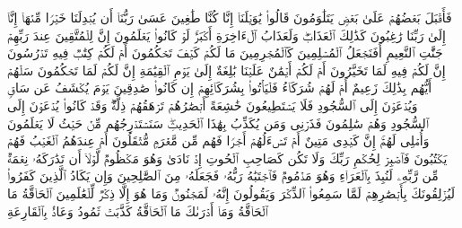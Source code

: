 \startbuffer[\q:68:30]
فَأَقۡبَلَ بَعۡضُهُمۡ عَلَىٰ بَعۡضࣲ یَتَلَٰوَمُونَ%
\stopbuffer
\startbuffer[\q:68:31]
قَالُوا۟ یَٰوَیۡلَنَاۤ إِنَّا كُنَّا طَٰغِینَ%
\stopbuffer
\startbuffer[\q:68:32]
عَسَىٰ رَبُّنَاۤ أَن یُبۡدِلَنَا خَیۡرࣰا مِّنۡهَاۤ إِنَّاۤ إِلَىٰ رَبِّنَا رَٰغِبُونَ%
\stopbuffer
\startbuffer[\q:68:33]
كَذَٰلِكَ ٱلۡعَذَابُۖ وَلَعَذَابُ ٱلۡءَاخِرَةِ أَكۡبَرُۚ لَوۡ كَانُوا۟ یَعۡلَمُونَ%
\stopbuffer
\startbuffer[\q:68:34]
إِنَّ لِلۡمُتَّقِینَ عِندَ رَبِّهِمۡ جَنَّٰتِ ٱلنَّعِیمِ%
\stopbuffer
\startbuffer[\q:68:35]
أَفَنَجۡعَلُ ٱلۡمُسۡلِمِینَ كَٱلۡمُجۡرِمِینَ%
\stopbuffer
\startbuffer[\q:68:36]
مَا لَكُمۡ كَیۡفَ تَحۡكُمُونَ%
\stopbuffer
\startbuffer[\q:68:37]
أَمۡ لَكُمۡ كِتَٰبࣱ فِیهِ تَدۡرُسُونَ%
\stopbuffer
\startbuffer[\q:68:38]
إِنَّ لَكُمۡ فِیهِ لَمَا تَخَیَّرُونَ%
\stopbuffer
\startbuffer[\q:68:39]
أَمۡ لَكُمۡ أَیۡمَٰنٌ عَلَیۡنَا بَٰلِغَةٌ إِلَىٰ یَوۡمِ ٱلۡقِیَٰمَةِ إِنَّ لَكُمۡ لَمَا تَحۡكُمُونَ%
\stopbuffer
\startbuffer[\q:68:40]
سَلۡهُمۡ أَیُّهُم بِذَٰلِكَ زَعِیمٌ%
\stopbuffer
\startbuffer[\q:68:41]
أَمۡ لَهُمۡ شُرَكَاۤءُ فَلۡیَأۡتُوا۟ بِشُرَكَاۤئِهِمۡ إِن كَانُوا۟ صَٰدِقِینَ%
\stopbuffer
\startbuffer[\q:68:42]
یَوۡمَ یُكۡشَفُ عَن سَاقࣲ وَیُدۡعَوۡنَ إِلَى ٱلسُّجُودِ فَلَا یَسۡتَطِیعُونَ%
\stopbuffer
\startbuffer[\q:68:43]
خَٰشِعَةً أَبۡصَٰرُهُمۡ تَرۡهَقُهُمۡ ذِلَّةࣱۖ وَقَدۡ كَانُوا۟ یُدۡعَوۡنَ إِلَى ٱلسُّجُودِ وَهُمۡ سَٰلِمُونَ%
\stopbuffer
\startbuffer[\q:68:44]
فَذَرۡنِی وَمَن یُكَذِّبُ بِهَٰذَا ٱلۡحَدِیثِۖ سَنَسۡتَدۡرِجُهُم مِّنۡ حَیۡثُ لَا یَعۡلَمُونَ%
\stopbuffer
\startbuffer[\q:68:45]
وَأُمۡلِی لَهُمۡۚ إِنَّ كَیۡدِی مَتِینٌ%
\stopbuffer
\startbuffer[\q:68:46]
أَمۡ تَسۡءَلُهُمۡ أَجۡرࣰا فَهُم مِّن مَّغۡرَمࣲ مُّثۡقَلُونَ%
\stopbuffer
\startbuffer[\q:68:47]
أَمۡ عِندَهُمُ ٱلۡغَیۡبُ فَهُمۡ یَكۡتُبُونَ%
\stopbuffer
\startbuffer[\q:68:48]
فَٱصۡبِرۡ لِحُكۡمِ رَبِّكَ وَلَا تَكُن كَصَاحِبِ ٱلۡحُوتِ إِذۡ نَادَىٰ وَهُوَ مَكۡظُومࣱ%
\stopbuffer
\startbuffer[\q:68:49]
لَّوۡلَاۤ أَن تَدَٰرَكَهُۥ نِعۡمَةࣱ مِّن رَّبِّهِۦ لَنُبِذَ بِٱلۡعَرَاۤءِ وَهُوَ مَذۡمُومࣱ%
\stopbuffer
\startbuffer[\q:68:50]
فَٱجۡتَبَٰهُ رَبُّهُۥ فَجَعَلَهُۥ مِنَ ٱلصَّٰلِحِینَ%
\stopbuffer
\startbuffer[\q:68:51]
وَإِن یَكَادُ ٱلَّذِینَ كَفَرُوا۟ لَیُزۡلِقُونَكَ بِأَبۡصَٰرِهِمۡ لَمَّا سَمِعُوا۟ ٱلذِّكۡرَ وَیَقُولُونَ إِنَّهُۥ لَمَجۡنُونࣱ%
\stopbuffer
\startbuffer[\q:68:52]
وَمَا هُوَ إِلَّا ذِكۡرࣱ لِّلۡعَٰلَمِینَ%
\stopbuffer
\startbuffer[\q:69:1]
ٱلۡحَاۤقَّةُ%
\stopbuffer
\startbuffer[\q:69:2]
مَا ٱلۡحَاۤقَّةُ%
\stopbuffer
\startbuffer[\q:69:3]
وَمَاۤ أَدۡرَىٰكَ مَا ٱلۡحَاۤقَّةُ%
\stopbuffer
\startbuffer[\q:69:4]
كَذَّبَتۡ ثَمُودُ وَعَادُۢ بِٱلۡقَارِعَةِ%
\stopbuffer
\startbuffer[\q:69:5]

